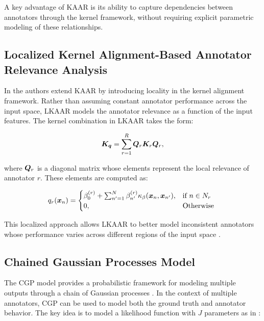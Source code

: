 A key advantage of \gls{KAAR} is its ability to capture dependencies
between annotators through the kernel framework, without requiring
explicit parametric modeling of these relationships.

\subsection{Localized Kernel Alignment-Based Annotator Relevance
Analysis}

In \cite{GilGonzalezEtAl2021} the authors extend \gls{KAAR} by introducing
locality in the kernel alignment framework. Rather than assuming
constant annotator performance across the input space, \gls{LKAAR} models
the annotator relevance as a function of the input features. The
kernel combination in \gls{LKAAR} takes the form:

\begin{equation}
  {\bm{K}}_{{\bm{q}}} =\sum_{r=1}^{R}{\bm{Q}}_r{\bm{K}}_r{\bm{Q}}_r,
\end{equation}

where ${\bm{Q}}_r$ is a diagonal matrix whose elements represent the
local relevance of annotator $r$. These elements are computed as:

\begin{align}
  q_r({\bm{x}}_n) =
  \begin{cases}
    \beta_0^{(r)} + \sum_{n^{\prime}=1}^{N}\beta_{n^{\prime}}^{(r)}
    \kappa_{\beta}({\bm{x}}_n,{\bm{x}}_{n^{\prime}}), & \mbox{if } n\in N_r\\
    0, & \mbox{Otherwise }
  \end{cases}
\end{align}

This localized approach allows \gls{LKAAR} to better model inconsistent
annotators whose performance varies across different regions of the
input space \cite{GilGonzalezEtAl2021}.

\subsection{Chained Gaussian Processes Model}

The \gls{CGP} model provides a probabilistic framework for modeling
multiple outputs through a chain of Gaussian processes \cite{SaulEtAl2016}.
In the context of multiple annotators, \gls{CGP} can be used to model
both the ground truth and annotator behavior. The key idea is to model
a likelihood function with $J$ parameters as in \cite{GiraldoEtAl2022}:

